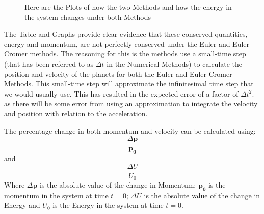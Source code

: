 \documentclass[a4paper,10pt]{article}
\begin{document}
\begin{figure}[]
   \centering
   \caption{Here are the Plots of how the two Methods and how the energy in the system changes under both Methods}
   \label{plot:linear}
\end{figure}
\newpage
The Table and Graphs provide clear evidence that these conserved quantities, energy and momentum, are not perfectly conserved under the Euler and Euler-Cromer methods. The reasoning for this is the methods use a small-time step (that has been referred to as $\Delta t$ in the Numerical Methods) to calculate the position and velocity of the planets for both the Euler and Euler-Cromer Methods. This small-time step will approximate the infinitesimal time step that we would usually use. This has resulted in the expected error of a factor of $\Delta t^{2}$. as there will be some error from using an approximation to integrate the velocity and position with relation to the acceleration.

The percentage change in both momentum and velocity can be calculated using:
\begin{equation}
   \frac {\Delta \boldsymbol{p}}{\boldsymbol{p_{0}}} 
\end{equation}
and 
\begin{equation}
   \frac {\Delta {U}}{{U_{0}}}
\end{equation}
Where $\Delta \boldsymbol{p}$ is the absolute value of the change in Momentum; $\boldsymbol{p_{0}}$ is the momentum in the system at time $t=0$; $\Delta {U}$ is the absolute value of the change in Energy and ${U_{0}}$ is the Energy in the system at time $t=0$.
\end{document}

